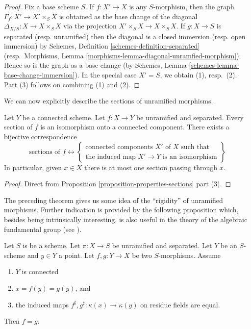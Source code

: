 \begin{proof}
Fix a base scheme $S$.
If $f : X' \to X$ is any $S$-morphism, then the graph
$\Gamma_f : X' \to X' \times_S X$
is obtained as the base change of the diagonal
$\Delta_{X/S} : X \to X \times_S X$ via the projection
$X' \times_S X \to X \times_S X$.
If $g : X \to S$ is separated (resp. unramified)
then the diagonal is a closed immersion (resp. open immersion)
by Schemes, Definition \ref{schemes-definition-separated}
(resp.\ Morphisms, Lemma \ref{morphisms-lemma-diagonal-unramfied-morphism}).
Hence so is the graph as a base change (by
Schemes, Lemma \ref{schemes-lemma-base-change-immersion}).
In the special case $X' = S$, we obtain (1), resp.\ (2).
Part (3) follows on combining (1) and (2).
\end{proof}

\noindent
We can now explicitly describe the sections of unramified morphisms.

\begin{theorem}
\label{theorem-sections-unramified-maps}
Let $Y$ be a connected scheme.
Let $f : X \to Y$ be unramified and separated.
Every section of $f$ is an isomorphism onto a connected component.
There exists a bijective correspondence
$$
\text{sections of }f
\leftrightarrow
\left\{
\begin{matrix}
\text{connected components }X'\text{ of }X\text{ such that}\\
\text{the induced map }X' \to Y\text{ is an isomorphism}
\end{matrix}
\right\}
$$
In particular, given $x \in X$ there is at most one
section passing through $x$.
\end{theorem}

\begin{proof}
Direct from Proposition \ref{proposition-properties-sections} part (3).
\end{proof}

\noindent
The preceding theorem gives us some idea of the ``rigidity'' of unramified
morphisms. Further indication is provided by the following proposition which,
besides being intrinsically interesting, is also useful in the
theory of the algebraic fundamental group (see \cite[Expose V]{SGA1}).

\begin{proposition}
\label{proposition-equality}
Let $S$ is be a scheme.
Let $\pi : X \to S$ be unramified and separated.
Let $Y$ be an $S$-scheme and $y \in Y$ a point.
Let $f, g : Y \to X$ be two $S$-morphisms. Assume
\begin{enumerate}
\item $Y$ is connected
\item $x = f(y) = g(y)$, and
\item the induced maps $f^\sharp, g^\sharp : \kappa(x) \to \kappa(y)$
on residue fields are equal.
\end{enumerate}
Then $f = g$.
\end{proposition}

